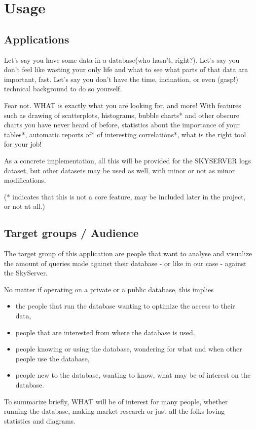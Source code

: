 \section{Usage}
\subsection{Applications}
Let's say you have some data in a database(who hasn't, right?).
Let's say you don't feel like wasting your only life and what to see what parts of that data ara important, fast.
Let's say you don't have the time, incination, or even (gasp!) technical background to do so yourself.

Fear not. WHAT is exactly what you are looking for, and more!
With features such as drawing of scatterplots, histograms, bubble charts* 
and other obscure charts you have never heard of before, statistics about the importance of your tables*,
automatic reports of* of interesting correlations*, what is the right tool for your job!

As a concrete implementation, all this will be provided for the SKYSERVER logs dataset, but other datasets may be
used as well, with minor or not as minor modifications.

(* indicates that this is not a core feature, may be included later in the project, or not at all.)

\subsection{Target groups / Audience}

The target group of this application are people that want to analyse 
and visualize the amount of queries made against their database - or like
in our case - against the SkyServer.

No matter if operating on a private or a public database, this implies
\begin{itemize}
  \item the people that run the database wanting to optimize the access to
  	their data,
  	
  \item people that are interested from where the database is used,

  \item people knowing or using the database, wondering for what and when other people
  use the database,
  
  \item people new to the database, wanting to know, what may be of interest
  on the database.

\end{itemize}
To summarize briefly, WHAT will be of interest for many people, 
whether running the database, making market research or just all the folks
loving statistics and diagrams.

